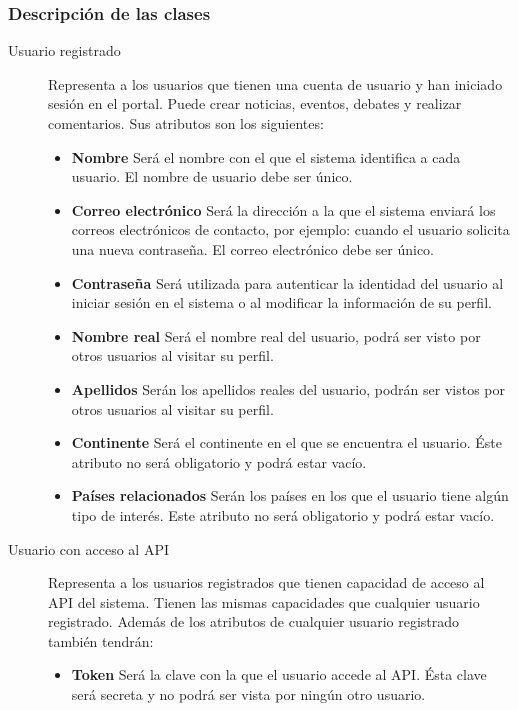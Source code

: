 \subsubsection{Descripción de las clases}
\begin{description}
\item[Usuario registrado]	Representa a los usuarios que tienen una cuenta de usuario y han iniciado sesión en el portal.  Puede crear noticias, eventos, debates y realizar comentarios.  Sus atributos son los siguientes:
							\begin{itemize}
								\item \textbf{Nombre}  Será el nombre con el que el sistema identifica a cada usuario.  El nombre de usuario debe ser único.
								\item \textbf{Correo electrónico}  Será la dirección a la que el sistema enviará los correos electrónicos de contacto, por ejemplo: cuando el usuario solicita una nueva contraseña.  El correo electrónico debe ser único.
								\item \textbf{Contraseña}  Será utilizada para autenticar la identidad del usuario al iniciar sesión en el sistema o al modificar la información de su perfil.
								\item \textbf{Nombre real}  Será el nombre real del usuario, podrá ser visto por otros usuarios al visitar su perfil.
								\item \textbf{Apellidos}  Serán los apellidos reales del usuario, podrán ser vistos por otros usuarios al visitar su perfil.
								\item \textbf{Continente}  Será el continente en el que se encuentra el usuario.  Éste atributo no será obligatorio y podrá estar vacío.
								\item \textbf{Países relacionados}  Serán los países en los que el usuario tiene algún tipo de interés.  Este atributo no será obligatorio y podrá estar vacío.
							\end{itemize}
\item[Usuario con acceso al API]  Representa a los usuarios registrados que tienen capacidad de acceso al API del sistema.  Tienen las mismas capacidades que cualquier usuario registrado.  Además de los atributos de cualquier usuario registrado también tendrán:
							\begin{itemize}
							\item \textbf{Token}  Será la clave con la que el usuario accede al API.  Ésta clave será secreta y no podrá ser vista por ningún otro usuario.
							\end{itemize}

\end{description}
